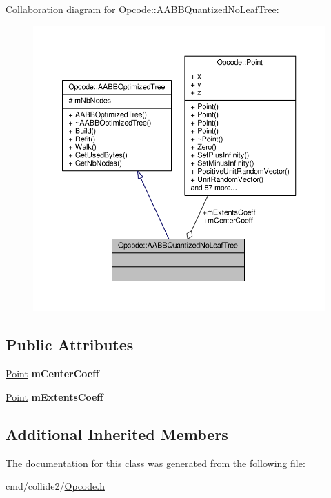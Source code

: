 Collaboration diagram for Opcode\+:\+:A\+A\+B\+B\+Quantized\+No\+Leaf\+Tree\+:
\nopagebreak
\begin{figure}[H]
\begin{center}
\leavevmode
\includegraphics[width=350pt]{d7/d44/classOpcode_1_1AABBQuantizedNoLeafTree__coll__graph}
\end{center}
\end{figure}
\subsection*{Public Attributes}
\begin{DoxyCompactItemize}
\item 
\hyperlink{classOpcode_1_1Point}{Point} {\bfseries m\+Center\+Coeff}\hypertarget{classOpcode_1_1AABBQuantizedNoLeafTree_ae8a53f4494002b16476c169b746f2a85}{}\label{classOpcode_1_1AABBQuantizedNoLeafTree_ae8a53f4494002b16476c169b746f2a85}

\item 
\hyperlink{classOpcode_1_1Point}{Point} {\bfseries m\+Extents\+Coeff}\hypertarget{classOpcode_1_1AABBQuantizedNoLeafTree_aa6d74fa90b5755afa7e908a035ba9614}{}\label{classOpcode_1_1AABBQuantizedNoLeafTree_aa6d74fa90b5755afa7e908a035ba9614}

\end{DoxyCompactItemize}
\subsection*{Additional Inherited Members}


The documentation for this class was generated from the following file\+:\begin{DoxyCompactItemize}
\item 
cmd/collide2/\hyperlink{Opcode_8h}{Opcode.\+h}\end{DoxyCompactItemize}
